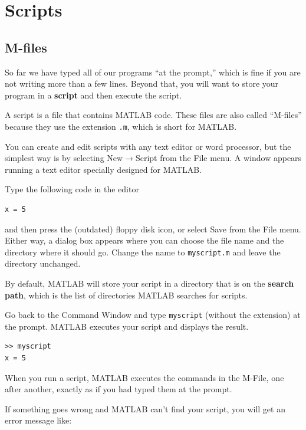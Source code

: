 \documentclass{book}
\begin{document}
\chapter{Scripts}

\section{M-files}

So far we have typed all of our programs ``at the prompt,'' which is
fine if you are not writing more than a few lines.  Beyond that,
you will want to store your program in a {\bf script} and then
execute the script.

A script is a file that contains MATLAB code.  These files are
also called ``M-files'' because they use the extension {\tt .m},
which is short for MATLAB.

You can create and edit
scripts with any text editor or word processor, but the simplest way
is by selecting {\sf New}$\rightarrow${\sf Script} from the {\sf File}
menu.  A window appears running a text editor specially designed for
MATLAB.

Type the following code in the editor

\begin{verbatim}
x = 5
\end{verbatim}

and then press the (outdated) floppy disk icon, or select {\sf Save}
from the {\sf File} menu.  Either way, a dialog box appears where you
can choose the file name and the directory where it should go.  Change
the name to {\tt myscript.m} and leave the directory unchanged.

By default, MATLAB will store your script in a directory that is on
the {\bf search path}, which is the list of directories MATLAB
searches for scripts.

Go back to the Command Window and type {\tt myscript} (without the
extension) at the prompt.  MATLAB executes your script and displays
the result.

\begin{verbatim}
>> myscript
x = 5
\end{verbatim}

When you run a script, MATLAB executes the commands in the M-File, one
after another, exactly as if you had typed them at the prompt.

If something goes wrong and MATLAB can't find your script, you will
get an error message like:
\end{document}
